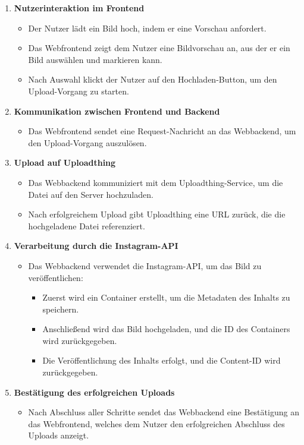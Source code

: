 \begin{enumerate}
    \item \textbf{Nutzerinteraktion im Frontend}
    \begin{itemize}
        \item Der Nutzer lädt ein Bild hoch, indem er eine Vorschau anfordert.
        \item Das Webfrontend zeigt dem Nutzer eine Bildvorschau an, aus der er ein Bild auswählen und markieren kann.
        \item Nach Auswahl klickt der Nutzer auf den Hochladen-Button, um den Upload-Vorgang zu starten.
    \end{itemize}

\newpage

    \item \textbf{Kommunikation zwischen Frontend und Backend}
    \begin{itemize}
        \item Das Webfrontend sendet eine Request-Nachricht an das Webbackend, um den Upload-Vorgang auszulösen.
    \end{itemize}

    \item \textbf{Upload auf Uploadthing}
    \begin{itemize}
        \item Das Webbackend kommuniziert mit dem Uploadthing-Service, um die Datei auf den Server hochzuladen.
        \item Nach erfolgreichem Upload gibt Uploadthing eine URL zurück, die die hochgeladene Datei referenziert.
    \end{itemize}

    \item \textbf{Verarbeitung durch die Instagram-\ac{API}}
    \begin{itemize}
        \item Das Webbackend verwendet die Instagram-\ac{API}, um das Bild zu veröffentlichen:
        \begin{itemize}
            \item Zuerst wird ein Container erstellt, um die Metadaten des Inhalts zu speichern.
            \item Anschließend wird das Bild hochgeladen, und die ID des Containers wird zurückgegeben.
            \item Die Veröffentlichung des Inhalts erfolgt, und die Content-ID wird zurückgegeben.
        \end{itemize}
    \end{itemize}

    \item \textbf{Bestätigung des erfolgreichen Uploads}
    \begin{itemize}
        \item Nach Abschluss aller Schritte sendet das Webbackend eine Bestätigung an das Webfrontend, welches dem Nutzer den erfolgreichen Abschluss des Uploads anzeigt.
    \end{itemize}
\end{enumerate}

